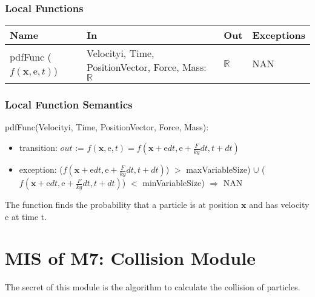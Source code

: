 \documentclass[12pt, titlepage]{article}
\begin{document}
\subsubsection{Local Functions}

\begin{center}
	\begin{tabular}{p{2cm} p{3cm} p{4cm} p{2cm}}
		\hline
		\textbf{Name} & \textbf{In} & \textbf{Out} & \textbf{Exceptions} \\
		\hline
		pdfFunc ($f(\mathrm{\textbf{x}},\mathrm{e},t)$) & Velocityi, Time, PositionVector, Force, Mass: $\mathbb{R}$ & $\mathbb{R}$ & NAN \\
		\hline
	\end{tabular}
\end{center}

\subsubsection{Local Function Semantics}

\noindent pdfFunc(Velocityi, Time, PositionVector, Force, Mass):
\begin{itemize}
	\item transition: $out$ := $f(\mathrm{\textbf{x}},\mathrm{e},t) = f(\mathrm{\textbf{x}} +\mathrm{e}dt, \mathrm{e} + \frac{F}{kg}dt, t + dt)$
	\item exception: ($f(\mathrm{\textbf{x}} +\mathrm{e}dt, \mathrm{e} + \frac{F}{kg}dt, t + dt)$) $>$ maxVariableSize) $\cup$ ($f(\mathrm{\textbf{x}} +\mathrm{e}dt, \mathrm{e} + \frac{F}{kg}dt, t + dt)$) $<$ minVariableSize) $\Rightarrow$ NAN
\end{itemize}

The function finds the probability that a particle is at position $\textbf{x}$ and has velocity $\mathrm{e}$ at time t.\\

\newpage

\section{MIS of M7: Collision Module} \label{COModule} 

The secret of this module is the algorithm to calculate the collision of particles.
\end{document}
